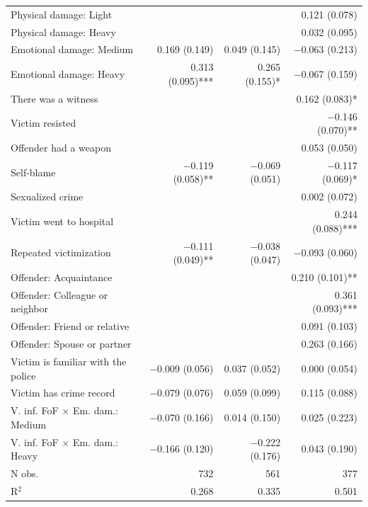 \begin{tabular}{lrrr}
Physical damage: Light &  &  & \num{0.121} (\num{0.078}) \\
Physical damage: Heavy &  &  & \num{0.032} (\num{0.095}) \\
Emotional damage: Medium & \num{0.169} (\num{0.149}) & \num{0.049} (\num{0.145}) & \num{-0.063} (\num{0.213}) \\
Emotional damage:  Heavy & \num{0.313} (\num{0.095})*** & \num{0.265} (\num{0.155})* & \num{-0.067} (\num{0.159}) \\
There was a witness &  &  & \num{0.162} (\num{0.083})* \\
Victim resisted &  &  & \num{-0.146} (\num{0.070})** \\
Offender had a weapon &  &  & \num{0.053} (\num{0.050}) \\
Self-blame & \num{-0.119} (\num{0.058})** & \num{-0.069} (\num{0.051}) & \num{-0.117} (\num{0.069})* \\
Sexualized crime &  &  & \num{0.002} (\num{0.072}) \\
Victim went to hospital &  &  & \num{0.244} (\num{0.088})*** \\
Repeated victimization & \num{-0.111} (\num{0.049})** & \num{-0.038} (\num{0.047}) & \num{-0.093} (\num{0.060}) \\
Offender:          Acquaintance &  &  & \num{0.210} (\num{0.101})** \\
Offender: Colleague or neighbor &  &  & \num{0.361} (\num{0.093})*** \\
Offender:    Friend or relative &  &  & \num{0.091} (\num{0.103}) \\
Offender:     Spouse or partner &  &  & \num{0.263} (\num{0.166}) \\
Victim is familiar with the police & \num{-0.009} (\num{0.056}) & \num{0.037} (\num{0.052}) & \num{0.000} (\num{0.054}) \\
Victim has crime record & \num{-0.079} (\num{0.076}) & \num{0.059} (\num{0.099}) & \num{0.115} (\num{0.088}) \\
V. inf. FoF $\times$ Em. dam.: Medium & \num{-0.070} (\num{0.166}) & \num{0.014} (\num{0.150}) & \num{0.025} (\num{0.223}) \\
V. inf. FoF $\times$ Em. dam.: Heavy & \num{-0.166} (\num{0.120}) & \num{-0.222} (\num{0.176}) & \num{0.043} (\num{0.190}) \\
N obs. & \num{732} & \num{561} & \num{377} \\
R$^2$ & \num{0.268} & \num{0.335} & \num{0.501} \\
\midrule
\end{tabular}
\endgroup